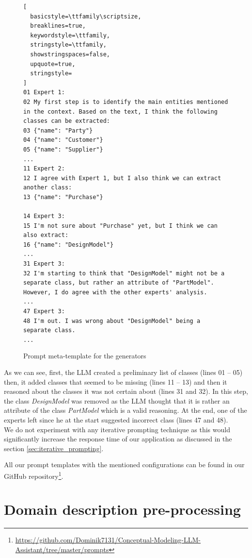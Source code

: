 \begin{figure}[!h]
    \centering
\begin{lstlisting}[
  basicstyle=\ttfamily\scriptsize,
  breaklines=true,
  keywordstyle=\ttfamily,
  stringstyle=\ttfamily,
  showstringspaces=false,
  upquote=true,
  stringstyle=
]
01 Expert 1:
02 My first step is to identify the main entities mentioned in the context. Based on the text, I think the following classes can be extracted:
03 {"name": "Party"}
04 {"name": "Customer"}
05 {"name": "Supplier"}
...
11 Expert 2:
12 I agree with Expert 1, but I also think we can extract another class:
13 {"name": "Purchase"}

14 Expert 3:
15 I'm not sure about "Purchase" yet, but I think we can also extract:
16 {"name": "DesignModel"}
...
31 Expert 3:
32 I'm starting to think that "DesignModel" might not be a separate class, but rather an attribute of "PartModel". However, I do agree with the other experts' analysis.
...
47 Expert 3:
48 I'm out. I was wrong about "DesignModel" being a separate class.
...

\end{lstlisting}
    \caption{\centering Prompt meta-template for the generators}
    \label{fig:meta-templates}
\end{figure}



As we can see, first, the LLM created a preliminary list of classes (lines 01 -- 05) then, it added classes that seemed to be missing (lines 11 -- 13) and then it reasoned about the classes it was not certain about (lines 31 and 32). In this step, the class \textit{DesignModel} was removed as the LLM thought that it is rather an attribute of the class \textit{PartModel} which is a valid reasoning. At the end, one of the experts left since he at the start suggested incorrect class (lines 47 and 48). \\

We do not experiment with any iterative prompting technique as this would significantly increase the response time of our application as discussed in the section \ref{sec:iterative_prompting}.

All our prompt templates with the mentioned configurations can be found in our GitHub repository\footnote{\url{https://github.com/Dominik7131/Conceptual-Modeling-LLM-Assistant/tree/master/prompts}}.


\section{Domain description pre-processing}

